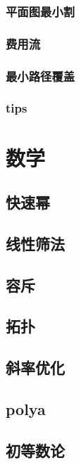 \documentclass[10pt]{article}
\begin{document}
\subsubsection{平面图最小割}

\subsubsection{费用流}
\subsubsection{最小路径覆盖}
\subsubsection{tips}


\section{数学}
\subsection{快速幂}

\subsection{线性筛法}

\subsection{容斥}
\subsection{拓扑}
\subsection{斜率优化}

\subsection{polya}

\subsection{初等数论}
\end{document}
